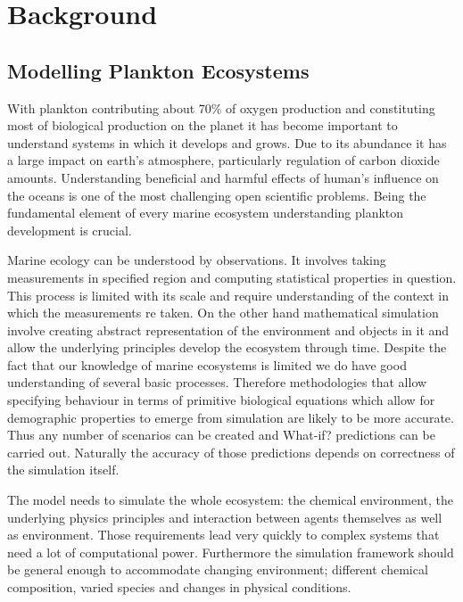 \documentclass[12pt, a4paper]{report}
\begin{document}
\chapter{Background}\label{ch:bkg}

\section{Modelling Plankton Ecosystems}\label{sec:model-plankton-eco}

With plankton contributing about 70\% of oxygen production and
constituting most of biological production on the planet it has
become important to understand systems in which it develops and
grows. Due to its abundance it has a large impact on earth's
atmosphere, particularly regulation of carbon dioxide amounts.
Understanding beneficial and harmful effects of human's influence
on the oceans is one of the most challenging open scientific
problems. Being the fundamental element of every marine ecosystem
understanding plankton development is crucial.

Marine ecology can be understood by observations. It involves
taking measurements in specified region and computing statistical
properties in question. This process is limited with its scale
and require understanding of the context in which the measurements
re taken. On the other hand mathematical simulation involve creating
abstract representation of the environment and objects in it and
allow the underlying principles develop the ecosystem through time.
Despite the fact that our knowledge of marine ecosystems is limited
we do have good understanding of several basic processes. Therefore
methodologies that allow specifying behaviour in terms of primitive
biological equations which allow for demographic properties to emerge
from simulation are likely to be more accurate. Thus any number of
scenarios can be created and What-if? predictions can be carried out.
Naturally the accuracy of those predictions depends on correctness
of the simulation itself.

The model needs to simulate the whole ecosystem: the chemical environment,
the underlying physics principles and interaction between agents themselves
as well as environment. Those requirements lead very quickly to complex systems
that need a lot of computational power. Furthermore the simulation framework
should be general enough to accommodate changing environment; different chemical composition,
varied species and changes in physical conditions.
\end{document}
